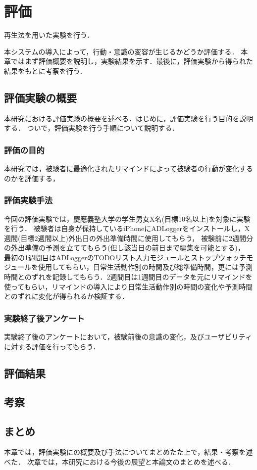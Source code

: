 \chapter{評価}
再生法\cite{Oguro1961}を用いた実験を行う．


本システムの導入によって，行動・意識の変容が生じるかどうか評価する．
本章ではまず評価概要を説明し，実験結果を示す．最後に，評価実験から得られた結果をもとに考察を行う．

\section{評価実験の概要}
本研究における評価実験の概要を述べる．はじめに，評価実験を行う目的を説明する．
ついで，評価実験を行う手順について説明する．

\subsection{評価の目的}
本研究では，被験者に最適化されたリマインドによって被験者の行動が変化するのかを評価する，

\subsection{評価実験手法}
今回の評価実験では，慶應義塾大学の学生男女X名(目標10名以上)を対象に実験を行う．
被験者は自身が保持しているiPhoneにADLoggerをインストールし，X週間(目標2週間以上)外出日の外出準備時間に使用してもらう，
被験前に2週間分の外出準備の予測を立ててもらう(但し該当日の前日まで編集を可能とする)，
最初の1週間目はADLoggerのTODOリスト入力モジュールとストップウォッチモジュールを使用してもらい，日常生活動作別の時間及び総準備時間，更には予測時間とのずれを記録してもらう．2週間目は1週間目のデータを元にリマインドを使ってもらい，リマインドの導入により日常生活動作別の時間の変化や予測時間とのずれに変化が得られるか検証する．

\subsection{実験終了後アンケート}
実験終了後のアンケートにおいて，被験前後の意識の変化，及びユーザビリティに対する評価を行ってもらう．%
\section{評価結果}
\section{考察}


\section{まとめ}
本章では，評価実験にの概要及び手法についてまとめたた上で，結果・考察を述べた．
次章では，本研究における今後の展望と本論文のまとめを述べる．
